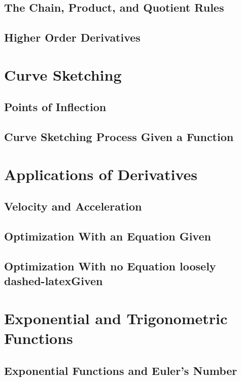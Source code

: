 \documentclass[14pt]{article}
\begin{document}
        \subsection{The Chain, Product, and Quotient Rules}
        \subsection{Higher Order Derivatives}

    \section{Curve Sketching}
        \subsection{Points of Inflection}
        \subsection{Curve Sketching Process Given a Function}
    
    \section{Applications of Derivatives}
        \subsection{Velocity and Acceleration}
        \subsection{Optimization With an Equation Given}
        \subsection{Optimization With no Equation loosely dashed-latexGiven}

    \section{Exponential and Trigonometric Functions}
    \subsection{Exponential Functions and Euler's Number}
\end{document}

